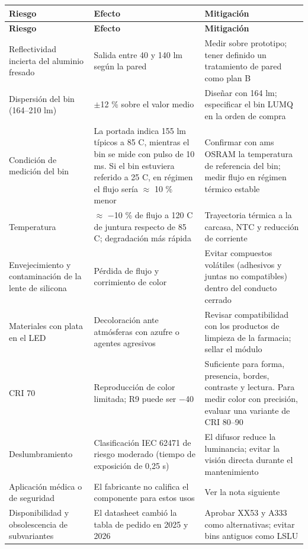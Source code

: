 \documentclass[11pt,a4paper]{article}
\begin{document}
\begingroup\footnotesize
\setlength{\tabcolsep}{4pt}
\setlength{\emergencystretch}{4em}
 
\begin{longtable}{@{}>{\RaggedRight\arraybackslash}p{}>{\RaggedRight\arraybackslash}p{}>{\RaggedRight\arraybackslash}p{}@{}}
\toprule
\scriptsize\textbf{Riesgo} & \scriptsize\textbf{Efecto} & \scriptsize\textbf{Mitigación} \\
\midrule
\endfirsthead
\toprule
\scriptsize\textbf{Riesgo} & \scriptsize\textbf{Efecto} & \scriptsize\textbf{Mitigación} \\
\midrule
\endhead
\bottomrule
\endfoot
Reflectividad incierta del aluminio fresado & Salida entre 40 y 140 lm según la pared & Medir sobre prototipo; tener definido un tratamiento de pared como plan B \\
Dispersión del bin (164–210 lm) & $\pm$12 \% sobre el valor medio & Diseñar con 164 lm; especificar el bin LUMQ en la orden de compra \\
Condición de medición del bin & La portada indica 155 lm típicos a 85 \textdegree{}C, mientras el bin se mide con pulso de 10 ms. Si el bin estuviera referido a 25 \textdegree{}C, en régimen el flujo sería $\approx$ 10 \% menor & Confirmar con ams OSRAM la temperatura de referencia del bin; medir flujo en régimen térmico estable \\
Temperatura & $\approx$ $-$10 \% de flujo a 120 \textdegree{}C de juntura respecto de 85 \textdegree{}C; degradación más rápida & Trayectoria térmica a la carcasa, NTC y reducción de corriente \\
Envejecimiento y contaminación de la lente de silicona & Pérdida de flujo y corrimiento de color & Evitar compuestos volátiles (adhesivos y juntas no compatibles) dentro del conducto cerrado \\
Materiales con plata en el LED & Decoloración ante atmósferas con azufre o agentes agresivos & Revisar compatibilidad con los productos de limpieza de la farmacia; sellar el módulo \\
CRI 70 & Reproducción de color limitada; R9 puede ser $-$40 & Suficiente para forma, presencia, bordes, contraste y lectura. Para medir color con precisión, evaluar una variante de CRI 80–90 \\
Deslumbramiento & Clasificación IEC 62471 de riesgo moderado (tiempo de exposición de 0,25 s) & El difusor reduce la luminancia; evitar la visión directa durante el mantenimiento \\
Aplicación médica o de seguridad & El fabricante no califica el componente para estos usos & Ver la nota siguiente \\
Disponibilidad y obsolescencia de subvariantes & El datasheet cambió la tabla de pedido en 2025 y 2026 & Aprobar XX53 y A333 como alternativas; evitar bins antiguos como LSLU \\
\end{longtable}
\endgroup
\end{document}
